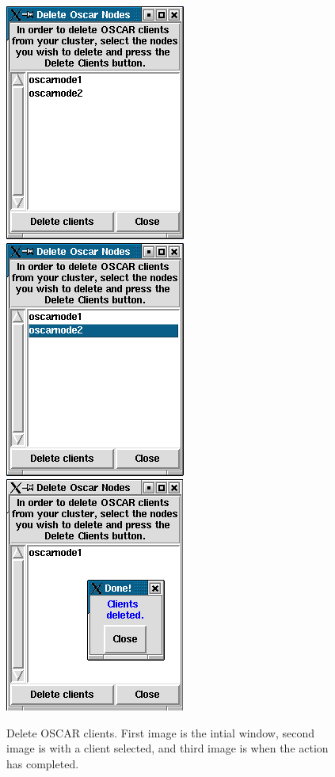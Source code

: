 \begin{figure}[h!]
  \begin{center}
    \centerline{
      \includegraphics[scale=\imgscale]{figs/10a_sbs-del-node}
      \hspace{\imghskip}
      \includegraphics[scale=\imgscale]{figs/10b_sbs-del-node-partA}
      \hspace{\imghskip}
      \includegraphics[scale=\imgscale]{figs/10b_sbs-del-node-partB}
      }
    \caption[Delete OSCAR Clients.]{Delete OSCAR clients.  First image
    is the intial window, second image is with a client selected, and
    third image is when the action has completed.}
    \label{fig:sbs-del-node1}
  \end{center}
\end{figure}



